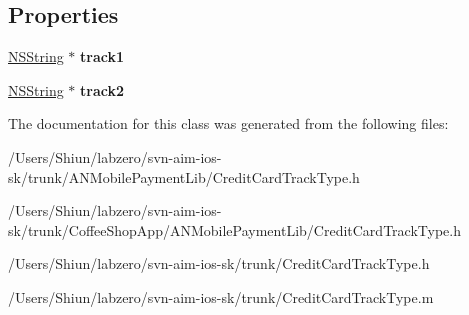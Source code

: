 \subsection*{Properties}
\begin{DoxyCompactItemize}
\item 
\hypertarget{interface_credit_card_track_type_a64ec5e7a21f534fb88810eda7b3046db}{
\hyperlink{class_n_s_string}{NSString} $\ast$ {\bfseries track1}}
\label{interface_credit_card_track_type_a64ec5e7a21f534fb88810eda7b3046db}

\item 
\hypertarget{interface_credit_card_track_type_ae92324e98c8ec561f5d4aa4a86b4102f}{
\hyperlink{class_n_s_string}{NSString} $\ast$ {\bfseries track2}}
\label{interface_credit_card_track_type_ae92324e98c8ec561f5d4aa4a86b4102f}

\end{DoxyCompactItemize}


The documentation for this class was generated from the following files:\begin{DoxyCompactItemize}
\item 
/Users/Shiun/labzero/svn-\/aim-\/ios-\/sk/trunk/ANMobilePaymentLib/CreditCardTrackType.h\item 
/Users/Shiun/labzero/svn-\/aim-\/ios-\/sk/trunk/CoffeeShopApp/ANMobilePaymentLib/CreditCardTrackType.h\item 
/Users/Shiun/labzero/svn-\/aim-\/ios-\/sk/trunk/CreditCardTrackType.h\item 
/Users/Shiun/labzero/svn-\/aim-\/ios-\/sk/trunk/CreditCardTrackType.m\end{DoxyCompactItemize}
